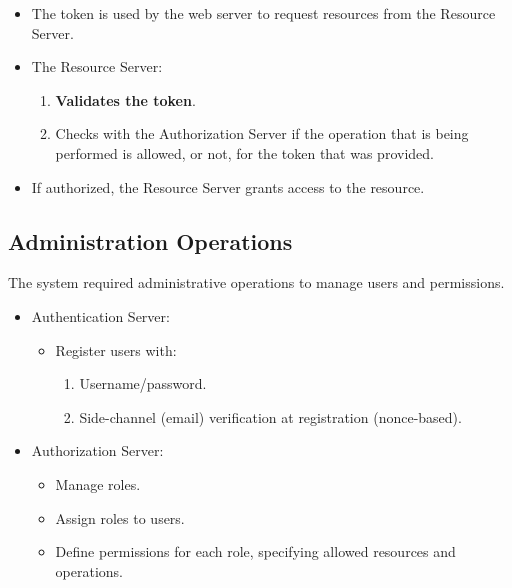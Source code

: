 \documentclass[10pt]{article}
\begin{document}
\begin{itemize}
\begin{itemize}
\begin{enumerate}
            \end{enumerate}
            \item The token is used by the web server to request resources from the Resource Server.
            \item The Resource Server:
            \begin{enumerate}
                \item \textbf{Validates the token}.
                \item Checks with the Authorization Server if the operation that is being performed is allowed, or not, for the token that was provided.
            \end{enumerate}
            \item If authorized, the Resource Server grants access to the resource.
        \end{itemize}
\end{itemize} 

\subsection{Administration Operations}

The system required administrative operations to manage users and permissions.

\begin{itemize}
    \item Authentication Server:
        \begin{itemize}
            \item Register users with:
            \begin{enumerate}
                \item Username/password.
                \item Side-channel (email) verification at registration (nonce-based).
            \end{enumerate}
        \end{itemize}
        \item Authorization Server:
            \begin{itemize}
                \item Manage roles.
                \item Assign roles to users.
                \item Define permissions for each role, specifying allowed resources and operations.
            \end{itemize}
\end{itemize}
\end{document}
